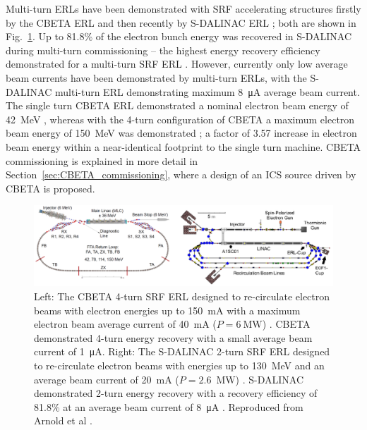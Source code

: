 \documentclass[../main.tex]{subfiles}
\begin{document}
Multi-turn ERLs have been demonstrated with SRF accelerating structures firstly by the CBETA ERL \cite{bartnik2020cbeta} and then recently by S-DALINAC ERL \cite{arnold2020first,adolphsen2022european}; both are shown in Fig.~\ref{fig:CBETA_SDALINAC_diagram}. Up to 81.8\% of the electron bunch energy was recovered in S-DALINAC during multi-turn commissioning -- the highest energy recovery efficiency demonstrated for a multi-turn SRF ERL \cite{adolphsen2022european}. However, currently only low average beam currents have been demonstrated by multi-turn ERLs, with the S-DALINAC multi-turn ERL demonstrating maximum 8~\si{\micro\ampere} average beam current. The single turn CBETA ERL demonstrated a nominal electron beam energy of 42~\si{\mega\electronvolt} \cite{gulliford2021measurement}, whereas with the 4-turn configuration of CBETA a maximum electron beam energy of 150~\si{\mega\electronvolt} was demonstrated \cite{bartnik2020cbeta}; a factor of 3.57 increase in electron beam energy within a near-identical footprint to the single turn machine. CBETA commissioning is explained in more detail in Section~\ref{sec:CBETA_commissioning}, where a design of an ICS source driven by CBETA is proposed.
\begin{figure}[!h]
\centering
\includegraphics[width=\textwidth]{Figures/Introduction/CBETA_SDALINAC_diagram.pdf}
\caption{Left: The CBETA 4-turn SRF ERL designed to re-circulate electron beams with electron energies up to 150~\si{\milli\ampere} with a maximum electron beam average current of 40~\si{\milli\ampere} ($P = 6~\si{\mega\watt}$) \cite{hoffstaetter2017cbeta}. CBETA demonstrated 4-turn energy recovery with a small average beam current of 1~\si{\micro\ampere}. Right: The S-DALINAC 2-turn SRF ERL designed to re-circulate electron beams with energies up to 130~\si{\mega\electronvolt} and an average beam current of 20~\si{\milli\ampere} ($P = 2.6$~\si{\mega\watt}) \cite{arnold2017erl}. S-DALINAC demonstrated 2-turn energy recovery with a recovery efficiency of 81.8\% at an average beam current of 8~\si{\micro\ampere} \cite{adolphsen2022european}. Reproduced from Arnold et al \cite{arnold2020first}.}
\label{fig:CBETA_SDALINAC_diagram}
\end{figure}
\end{document}
